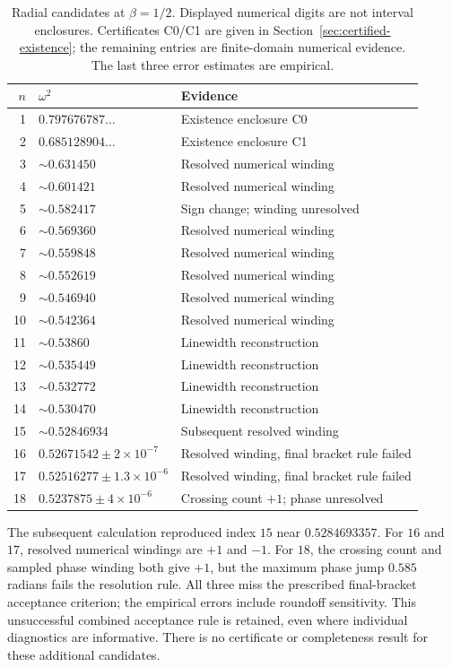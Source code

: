 \begin{table}[htbp]\centering\small
\caption{Radial candidates at $\beta=1/2$. Displayed numerical digits
are not interval enclosures. Certificates C0/C1 are given in
Section~\ref{sec:certified-existence}; the remaining entries are finite-domain
numerical evidence. The last three error estimates are empirical.}
\label{tab:ladder}
\begin{tabular}{rll}\toprule
$n$&$\omega^2$&Evidence\\\midrule
1&$0.797676787\ldots$&Existence enclosure C0\\
2&$0.685128904\ldots$&Existence enclosure C1\\
3&$\sim0.631450$&Resolved numerical winding\\
4&$\sim0.601421$&Resolved numerical winding\\
5&$\sim0.582417$&Sign change; winding unresolved\\
6&$\sim0.569360$&Resolved numerical winding\\
7&$\sim0.559848$&Resolved numerical winding\\
8&$\sim0.552619$&Resolved numerical winding\\
9&$\sim0.546940$&Resolved numerical winding\\
10&$\sim0.542364$&Resolved numerical winding\\
11&$\sim0.53860$&Linewidth reconstruction\\
12&$\sim0.535449$&Linewidth reconstruction\\
13&$\sim0.532772$&Linewidth reconstruction\\
14&$\sim0.530470$&Linewidth reconstruction\\
15&$\sim0.52846934$&Subsequent resolved winding\\
16&$0.52671542\pm2\times10^{-7}$&Resolved winding, final bracket rule failed\\
17&$0.52516277\pm1.3\times10^{-6}$&Resolved winding, final bracket rule failed\\
18&$0.5237875\pm4\times10^{-6}$&Crossing count $+1$; phase unresolved\\\bottomrule
\end{tabular}
\end{table}

The subsequent calculation reproduced index $15$ near $0.5284693357$.
For $16$ and $17$, resolved numerical windings are $+1$ and $-1$.
For $18$, the crossing count and sampled phase winding both give $+1$,
but the maximum phase jump $0.585$ radians fails the resolution rule.
All three miss the prescribed final-bracket acceptance criterion; the
empirical errors include roundoff sensitivity. This unsuccessful
combined acceptance rule is retained, even where individual diagnostics
are informative. There is no certificate or completeness result for
these additional candidates.

